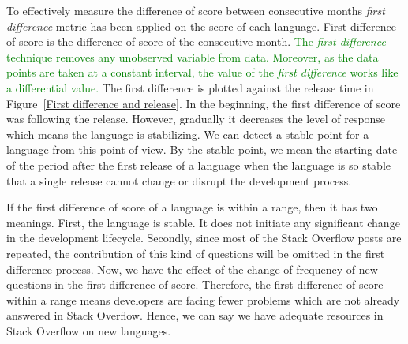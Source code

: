 To effectively measure the difference of score between consecutive months \emph{first difference} metric \citep{Rasheed2011} has been applied on the score of each language. First difference of score is the difference of score of the consecutive month. \textcolor{green}{The \emph{first difference} technique removes any unobserved variable from data. Moreover, as the data points are taken at a constant interval, the value of the \emph{first difference} works like a differential value.} The first difference is plotted against the release time in Figure~\ref{First difference and release}. In the beginning, the first difference of score was following the release. However, gradually it decreases the level of response which means the language is stabilizing. We can detect a stable point for a language from this point of view. By the stable point, we mean the starting date of the period after the first release of a language when the language is so stable that a single release cannot change or disrupt the development process.

If the first difference of score of a language is within a range, then it has two meanings. First, the language is stable. It does not initiate any significant change in the development lifecycle. Secondly, since most of the Stack Overflow posts are repeated, the contribution of this kind of questions will be omitted in the first difference process. Now, we have the effect of the change of frequency of new questions in the first difference of score. Therefore, the first difference of score within a range means developers are facing fewer problems which are not already answered in Stack Overflow. Hence, we can say we have adequate resources in Stack Overflow on new languages.

